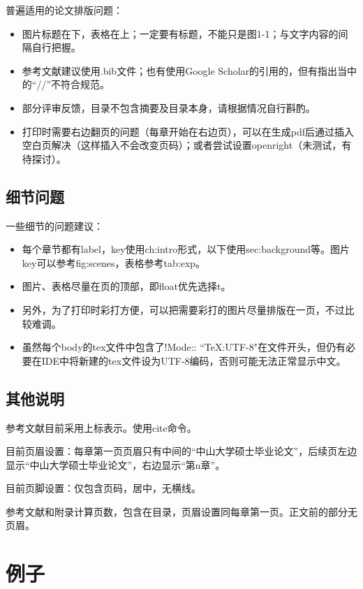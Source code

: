 普遍适用的论文排版问题：

\begin{itemize}
\item 图片标题在下，表格在上；一定要有标题，不能只是图1-1；与文字内容的间隔自行把握。
\item 参考文献建议使用.bib文件；也有使用Google Scholar的引用的，但有指出当中的“//”不符合规范。
\item 部分评审反馈，目录不包含摘要及目录本身，请根据情况自行斟酌。
\item 打印时需要右边翻页的问题（每章开始在右边页），可以在生成pdf后通过插入空白页解决（这样插入不会改变页码）；或者尝试设置openright（未测试，有待探讨）。
\end{itemize}

\subsection{细节问题}
\label{subsec:specs}

一些细节的问题建议：
\begin{itemize}
\item 每个章节都有label，key使用ch:intro形式，以下使用sec:background等。图片key可以参考fig:scenes，表格参考tab:exp。
\item 图片、表格尽量在页的顶部，即float优先选择t。
\item 另外，为了打印时彩打方便，可以把需要彩打的图片尽量排版在一页，不过比较难调。
\item 虽然每个body的tex文件中包含了!Mode:: ``TeX:UTF-8"在文件开头，但仍有必要在IDE中将新建的tex文件设为UTF-8编码，否则可能无法正常显示中文。
\end{itemize}

\subsection{其他说明}
\label{sec:setting}

参考文献\cite{wu2013online}目前采用上标表示。使用cite命令。

目前页眉设置：每章第一页页眉只有中间的“中山大学硕士毕业论文”，后续页左边显示“中山大学硕士毕业论文”，右边显示“第n章”。

目前页脚设置：仅包含页码，居中，无横线。

参考文献和附录计算页数，包含在目录，页眉设置同每章第一页。正文前的部分无页眉。

\section{例子}
\label{sec:examples}

